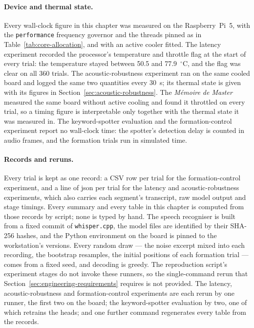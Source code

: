 \paragraph{Device and thermal state.} Every wall-clock figure in this chapter was measured on the
Raspberry~Pi~5, with the \texttt{performance} frequency governor and the threads pinned as in
Table~\ref{tab:core-allocation}, and with an active cooler fitted. The latency experiment recorded
the processor's temperature and throttle flag at the start of every trial: the temperature stayed
between 50.5 and 77.9~$^{\circ}$C, and the flag was clear on all 360 trials. The acoustic-robustness
experiment ran on the same cooled board and logged the same two quantities every 30~s; its thermal
state is given with its figures in Section~\ref{sec:acoustic-robustness}. The \emph{M\'emoire de
Master} measured the same board without active cooling and found it throttled on every trial, so a
timing figure is interpretable only together with the thermal state it was measured in. The
keyword-spotter evaluation and the formation-control experiment report no wall-clock time: the
spotter's detection delay is counted in audio frames, and the formation trials run in simulated
time.

\paragraph{Records and reruns.} Every trial is kept as one record: a CSV row per trial for the
formation-control experiment, and a line of \gls{json} per trial for the latency and
acoustic-robustness experiments, which also carries each segment's transcript, raw model output
and stage timings. Every summary and every table in this chapter is computed from those records
by script; none is typed by hand. The speech recogniser is built from a fixed commit of
\texttt{whisper.cpp}, the model files are identified by their SHA-256 hashes, and the Python
environment on the board is pinned to the workstation's versions. Every random draw --- the noise
excerpt mixed into each recording, the bootstrap resamples, the initial positions of each
formation trial --- comes from a fixed seed, and decoding is greedy. The reproduction script's
experiment stages do not invoke these runners, so the single-command rerun that
Section~\ref{sec:engineering-requirements} requires is not provided. The latency,
acoustic-robustness and formation-control experiments are each rerun by one runner, the first two
on the board; the keyword-spotter evaluation by two, one of which retrains the heads; and one
further command regenerates every table from the records.

